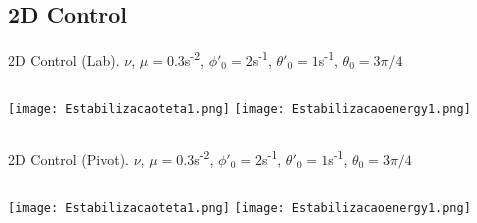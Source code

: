 \documentclass{beamer}
\begin{document}
\subsection{2D Control}
\begin{frame}[t]{\small2D Control (Lab). $\nu$, $\mu=0.3$s\textsuperscript{-2}, $\phi'_0=2$s\textsuperscript{-1}, $\theta'_0=1$s\textsuperscript{-1}, $\theta_0=3\pi/4$}
  \begin{columns}
             \centering
             \centering
             \texttt{[image: Estabilizacaoteta1.png]}
           \texttt{[image: Estabilizacaoenergy1.png]}
  \end{columns}
\end{frame}


\begin{frame}[t]{\small2D Control (Pivot). $\nu$, $\mu=0.3$s\textsuperscript{-2}, $\phi'_0=2$s\textsuperscript{-1}, $\theta'_0=1$s\textsuperscript{-1}, $\theta_0=3\pi/4$}
  \begin{columns}
             \centering
             \centering
             \texttt{[image: Estabilizacaoteta1.png]}
                \texttt{[image: Estabilizacaoenergy1.png]}
             

  \end{columns}
\end{frame}
\end{document}
